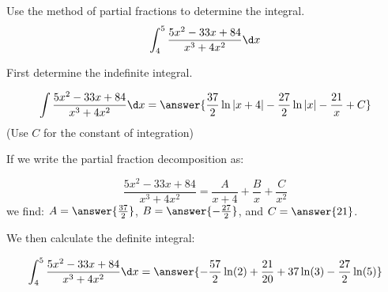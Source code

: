 \documentclass{ximera}
\author{Jason Miller}
\begin{document}
\begin{exercise}
Use the method of partial fractions to determine the integral.
\[
\int_{4}^{5} \frac{5x^{2}-33x+84}{x^{3}+4x^{2}} \d x
\]

First determine the indefinite integral.

\[
\int \frac{5x^{2}-33x+84}{x^{3}+4x^{2}} \d x=\answer{ \frac{37}{2} \ln|x+4| -\frac{27}{2}\ln|x| - \frac{21}{x} +C   } 
\]
(Use $C$ for the constant of integration)

\begin{hint}
If we write the partial fraction decomposition as:

\[
 \frac{5x^2-33x+84}{x^3+4x^2} = \frac{A}{x+4}+\frac{B}{x} +\frac{C}{x^2}
\]
we find: $A= \answer{\frac{37}{2}}$, $B= \answer{-\frac{27}{2}}$, and $C = \answer{21}$.
\end{hint}

\begin{exercise}

We then calculate the definite integral: 

\[
\int_{4}^{5} \frac{5x^{2}-33x+84}{x^{3}+4x^{2} }\d x=\answer{ -\frac{57}{2} \ln(2)+\frac{21}{20} +37 \ln(3)-\frac{27}{2} \ln(5) }
\]

\end{exercise}
\end{exercise}
\end{document}
